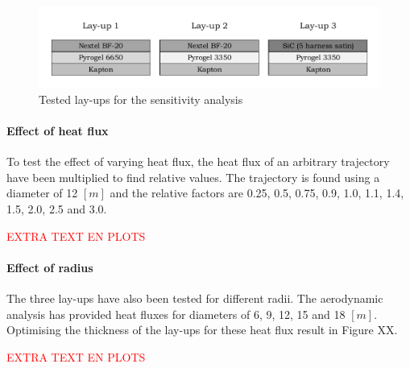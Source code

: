 \begin{figure}[h]
	\centering
	\includegraphics{./Figure/Thermal/layersensthermal.pdf}
	\caption{Tested lay-ups for the sensitivity analysis}
	\label{fig:layersensthermal}
\end{figure}

\paragraph{Effect of heat flux}
To test the effect of varying heat flux, the heat flux of an arbitrary trajectory have been multiplied to find relative values. The trajectory is found using a diameter of 12 $[m]$ and the relative factors are 0.25, 0.5, 0.75, 0.9, 1.0, 1.1, 1.4, 1.5, 2.0, 2.5 and 3.0. 

\textcolor{red}{EXTRA TEXT EN PLOTS}

\paragraph{Effect of radius}
The three lay-ups have also been tested for different radii. The aerodynamic analysis has provided heat fluxes for diameters of 6, 9, 12, 15 and 18 $[m]$. Optimising the thickness of the lay-ups for these heat flux result in Figure XX. 

\textcolor{red}{EXTRA TEXT EN PLOTS}
